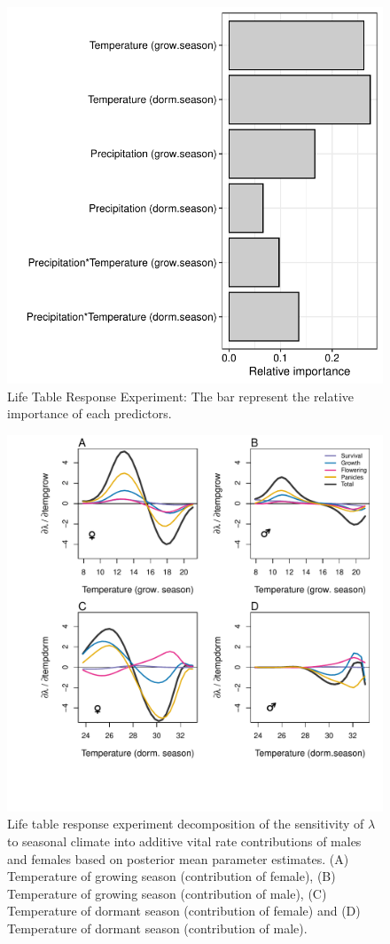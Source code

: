 \documentclass[12pt]{article}\usepackage[]{graphicx}\usepackage[dvipsnames]{xcolor}
\begin{document}
\begin{figure}[H]
  \begin{center}
    \includegraphics[width=0.65\linewidth]{Figures/Fig_LTRE.pdf}
  \caption{Life Table Response Experiment: The bar represent the relative importance of each predictors.}
  \label{Sup:LTRE}
  \end{center}
\end{figure}

\begin{figure}[H]
  \begin{center}
    \includegraphics[width=0.95\linewidth]{Figures/LTRE_Temperature.pdf}
  \caption{Life table response experiment decomposition of the sensitivity of $\lambda$ to seasonal climate into additive vital rate contributions of males and females based on posterior mean parameter estimates.
 (A) Temperature of growing season (contribution of female), (B) Temperature of growing season (contribution of male),  (C) Temperature of dormant season (contribution of female) and (D) Temperature of dormant season (contribution of male).}
  \label{Sup:LTRETemp}
  \end{center}
\end{figure}
\end{document}
